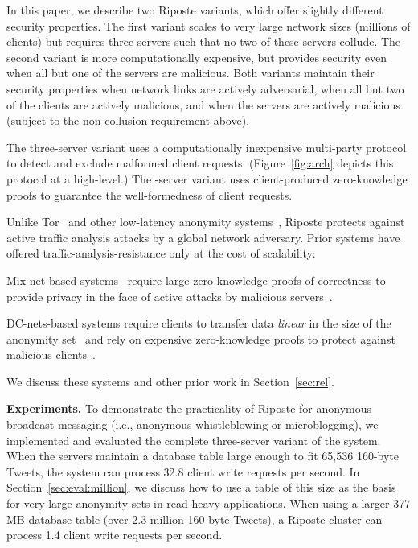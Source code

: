 \documentclass[10pt,twocolumn]{article}
\newcommand{\nicepara}[1]{\medskip\noindent\textbf{#1.}}
\newcommand{\name}{Riposte\xspace}
\begin{document}
In this paper, we describe two \name variants, which
offer slightly different security properties.
The first variant scales to very large network
sizes (millions of clients) but
requires three servers such that no two of these servers collude.
The second variant is more computationally expensive, 
but provides security
even when all but one of the  servers are malicious.
Both variants maintain their security properties
when network links are actively adversarial, when 
all but two of the clients are actively malicious, and
when the servers are actively malicious 
(subject to the non-collusion requirement above).

The three-server variant uses a computationally inexpensive
multi-party protocol to detect and exclude malformed client
requests. (Figure~\ref{fig:arch} depicts this
protocol at a high-level.)
The -server variant uses client-produced
zero-knowledge proofs to guarantee the well-formedness of 
client requests.

Unlike Tor~\cite{dingledine2004tor} and
other low-latency anonymity systems~\cite{goel2003herbivore,
  hsiao2012lap,
  leblond2013towards,
  reiter1998crowds},
\name protects against active traffic analysis attacks
by a global network adversary.
Prior systems have offered traffic-analysis-resistance 
only at the cost of scalability:
\begin{compactitem}
\item
Mix-net-based systems~\cite{chaum1981untraceable} require
large zero-knowledge proofs of correctness to provide privacy in
the face of active attacks by malicious servers~\cite{adida2007shuffle,bayer2012efficient,furukawa2004efficient,groth2010verifiable,neff2001verifiable}.
\item
DC-nets-based systems require clients to transfer data {\em linear} in the size
of the anonymity set~\cite{chaum1988dining,wolinsky2012dissent}
and rely on expensive zero-knowledge proofs
to protect against malicious clients~\cite{corrigangibbs2013proactively,golle2004dining}.
\end{compactitem}
We discuss these systems and other prior work in Section~\ref{sec:rel}.

\nicepara{Experiments}
To demonstrate the practicality of \name for 
anonymous broadcast messaging 
(i.e., anonymous whistleblowing or microblogging), we
implemented and evaluated the complete three-server variant of the system.
When the servers maintain a database table large enough to fit
65,536 160-byte Tweets, the system can process 32.8 client write
requests per second.
In Section~\ref{sec:eval:million}, we discuss how to use a table of this
size as the basis for very large anonymity 
sets in read-heavy applications.
When using a larger 377 MB database table (over 2.3 million 160-byte Tweets),
a \name cluster can process 1.4 client write requests per second.
\end{document}
